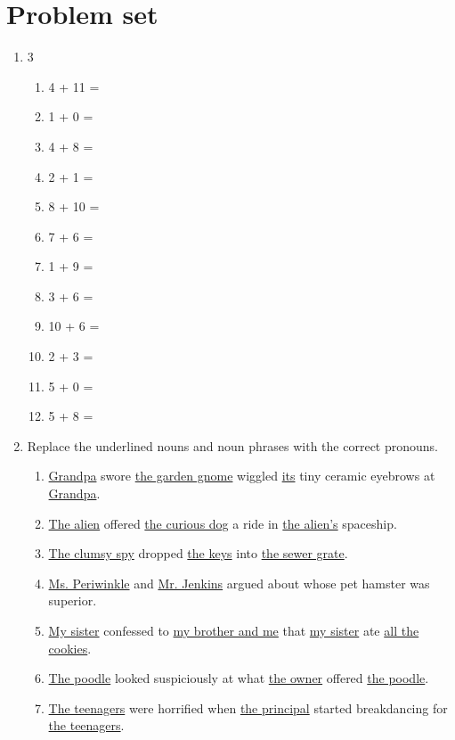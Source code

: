 \documentclass{tufte-book}
\begin{document}
\clearpage\section{Problem set }

\begin{enumerate}
\item
  \begin{multicols}{3}
    \begin{enumerate}\bigskip
      \item 4 + 11 = \dotfill\bigskip
      \item 1 + 0 = \dotfill\bigskip
      \item 4 + 8 = \dotfill\bigskip
      \item 2 + 1 = \dotfill
      \item 8 + 10 = \dotfill\bigskip
      \item 7 + 6 = \dotfill\bigskip
      \item 1 + 9 = \dotfill\bigskip
      \item 3 + 6 = \dotfill
      \item 10 + 6 = \dotfill\bigskip
      \item 2 + 3 = \dotfill\bigskip
      \item 5 + 0 = \dotfill\bigskip
      \item 5 + 8 = \dotfill
    \end{enumerate}
  \end{multicols}

  \item
  Replace the underlined nouns and noun phrases with the correct pronouns.

  \begin{enumerate}
      \item \underline{Grandpa} swore \underline{the garden gnome} wiggled \underline{its} tiny ceramic eyebrows at \underline{Grandpa}.\bigskip
      \item \underline{The alien} offered \underline{the curious dog} a ride in \underline{the alien's} spaceship.\bigskip
      \item \underline{The clumsy spy} dropped \underline{the keys} into \underline{the sewer grate}.\bigskip
      \item \underline{Ms. Periwinkle} and \underline{Mr. Jenkins} argued about whose pet hamster was superior.\bigskip
      \item \underline{My sister} confessed to \underline{my brother and me} that \underline{my sister} ate \underline{all the cookies}.\bigskip
      \item \underline{The poodle} looked suspiciously at what \underline{the owner} offered \underline{the poodle}.\bigskip
      \item \underline{The teenagers} were horrified when \underline{the principal} started breakdancing for \underline{the teenagers}.\bigskip
  \end{enumerate}


\end{enumerate}
\end{document}
